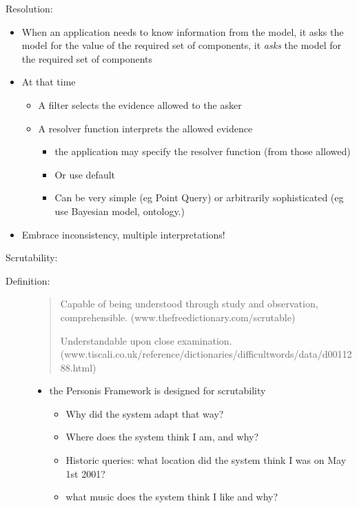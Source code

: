 \documentclass[letterpaper,10pt,english]{sphinxmanual}
\begin{document}
Resolution:
\begin{itemize}
\item {} 
When an application needs to know information from the model, it asks the model for the value of the required set of components, it \emph{asks} the model for the required set of components

\item {} 
At that time
\begin{itemize}
\item {} 
A filter selects the evidence allowed to the asker

\item {} 
A resolver function interprets the allowed evidence
\begin{itemize}
\item {} 
the application may specify the resolver function (from those allowed)

\item {} 
Or use default

\item {} 
Can be very simple (eg Point Query) or arbitrarily sophisticated (eg use Bayesian model, ontology.)

\end{itemize}

\end{itemize}

\item {} 
Embrace inconsistency, multiple interpretations!

\end{itemize}

Scrutability:
\begin{description}
\item[{Definition:}] \leavevmode\begin{quote}

Capable of being understood through study and observation, comprehensible.
(www.thefreedictionary.com/scrutable)

Understandable upon close examination. (www.tiscali.co.uk/reference/dictionaries/difficultwords/data/d0011288.html)
\end{quote}
\begin{itemize}
\item {} 
the Personis Framework is designed for scrutability
\begin{itemize}
\item {} 
Why did the system adapt that way?

\item {} 
Where does the system think I am, and why?

\item {} 
Historic queries: what location did the system think I was on May 1st 2001?

\item {} 
what music does the system think I like and why?

\end{itemize}

\end{itemize}

\end{description}
\end{document}
